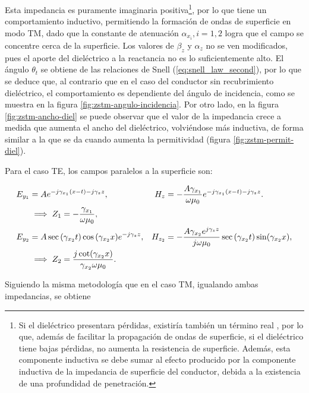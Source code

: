 
Esta impedancia es puramente imaginaria positiva\footnote{Si el dieléctrico presentara pérdidas, existiría también un término real \cite{Barlow:SurfaceWaves}, por lo que, además de facilitar la propagación de ondas de superficie, si el dieléctrico tiene bajas pérdidas, no aumenta la resistencia de superficie. Además, esta componente inductiva se debe sumar al efecto producido por la componente inductiva de la impedancia de superficie del conductor, debida a la existencia de una profundidad de penetración.}, por lo que tiene un comportamiento inductivo, permitiendo la formación de ondas de superficie en modo TM, dado que la constante de atenuación $\alpha_{x_i}, i=1,2$ logra que el campo se concentre cerca de la superficie. Los valores de $\beta_z$ y $\alpha_z$ no se ven modificados, pues el aporte del dieléctrico a la reactancia no es lo suficientemente alto. El ángulo $\theta_t$ se obtiene de las relaciones de Snell (\ref{eq:snell_law_second}), por lo que se deduce que, al contrario que en el caso del conductor sin recubrimiento dieléctrico, el comportamiento es dependiente del ángulo de incidencia, como se muestra en la figura \ref{fig:zstm-angulo-incidencia}. Por otro lado, en la figura \ref{fig:zstm-ancho-diel} se puede observar que el valor de la impedancia crece a medida que aumenta el ancho del dieléctrico, volviéndose más inductiva, de forma similar a la que se da cuando aumenta la permitividad (figura \ref{fig:zstm-permit-diel}).

Para el caso TE, los campos paralelos a la superficie son:

\begin{align}
	E_{y_1} &= A e^{-j\gamma_{x_1}(x-t)-j\gamma_z z}, &H_z &= -\frac{A \gamma_{x_1}}{\omega \mu_0} e^{-j\gamma_{x_1}(x-t)-j\gamma_z z}. \notag \\
	&\implies Z_{1} = -\frac{\gamma_{x_1}}{\omega \mu_0}, \\
	E_{y_2} &= A \sec{(\gamma_{x_2} t)} \cos{(\gamma_{x_2} x)} e^{-j \gamma_z z}, &H_{z_2} &= -\frac{A \gamma_{x_2} e^{j\gamma_z z}}{j\omega \mu_0} \sec{(\gamma_{x_2} t)} \sin(\gamma_{x_2} x), \notag \\
	&\implies Z_{2} = \frac{j\cot(\gamma_{x_2} x)}{\gamma_{x_2} \omega \mu_0}.
\end{align}

Siguiendo la misma metodología que en el caso TM, igualando ambas impedancias, se obtiene

